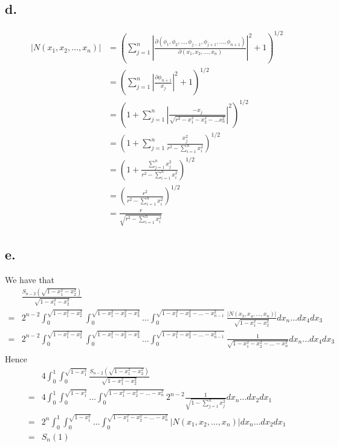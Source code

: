 \documentclass[11pt]{article}
\begin{document}
\subsection*{d.}
\begin{equation*}
    \begin{aligned}
        |N(x_1, x_2, \ldots, x_n)| 
        &= \left(\sum_{j=1}^n  \left| \frac{\partial (\phi_1, \phi_2, \ldots, \phi_{j-1}, \phi_{j+1}, \ldots, \phi_{n+1})}{\partial (x_1, x_2, \ldots, x_n)}\right|^2 + 1 \right)^{1/2} \\
        &= \left(\sum_{j=1}^n \left|\frac{\partial \phi_{n+1}}{x_j} \right|^2 + 1 \right)^{1/2} \\
        &= \left(1 + \sum_{j=1}^n \left|\frac{-x_j}{\sqrt{r^2 - x_1^2 - x_2^2 - \ldots x_n^2}} \right|^2 \right)^{1/2} \\
        &= \left(1 + \sum_{j=1}^n \frac{x_j^2}{r^2 - \sum_{i=1}^n x_i^2} \right)^{1/2} \\
        &= \left(1 + \frac{\sum_{j=1}^n x_j^2}{r^2 - \sum_{i=1}^n x_i^2} \right)^{1/2} \\
        &= \left(\frac{r^2}{r^2 - \sum_{i=1}^n x_i^2} \right)^{1/2} \\
        &= \frac{r}{\sqrt{r^2 - \sum_{i=1}^n x_i^2}}
    \end{aligned}
\end{equation*}
\subsection*{e.}
We have that 
\begin{equation*}
    \begin{aligned}
        &\frac{S_{n-2}\left(\sqrt{1-x_1^2 - x_2^2} \right)}{\sqrt{1-x_1^2 -x_2^2}} \\
        =& 2^{n-2} \int_0^{\sqrt{1-x_1^2-x_2^2}} \int_0^{\sqrt{1-x_1^2-x_2^2-x_3^2}} \ldots \int_0^{\sqrt{1-x_1^2-x_2^2-\ldots-x_{n-1}^2}} \frac{|N(x_3, x_4, \ldots, x_n)|}{\sqrt{1-x_1^2-x_2^2}} dx_n \ldots dx_4 dx_3 \\
        =& 2^{n-2} \int_0^{\sqrt{1-x_1^2-x_2^2}} \int_0^{\sqrt{1-x_1^2-x_2^2-x_3^2}} \ldots \int_0^{\sqrt{1-x_1^2-x_2^2-\ldots-x_{n-1}^2}} \frac{1}{\sqrt{1-x_1^2-x_2^2-\ldots-x_n^2}} dx_n \ldots dx_4 dx_3 \\
    \end{aligned}
\end{equation*}
Hence 
\begin{equation*}
    \begin{aligned}
        & 4 \int_0^1 \int_0^{\sqrt{1-x_1^2}} \frac{S_{n-2}(\sqrt{1-x_1^2 -x_2^2})}{\sqrt{1-x_1^2-x_2^2}} \\
        =& 4 \int_0^1 \int_0^{\sqrt{1-x_1^2}} \ldots \int_0^{\sqrt{1-x_1^2 - x_2^2 - \ldots - x_n^2}} 2^{n-2} \frac{1}{\sqrt{1 - \sum_{j=1}^n x_j^2}} dx_n \ldots dx_2 dx_1 \\
        =& 2^n \int_0^1 \int_0^{\sqrt{1-x_1^2}} \ldots \int_0^{\sqrt{1-x_1^2 - x_2^2 - \ldots - x_n^2}} |N(x_1, x_2, \ldots, x_n)| dx_n \ldots dx_2 dx_1 \\
        =& S_n(1)
    \end{aligned}
\end{equation*}
\end{document}
